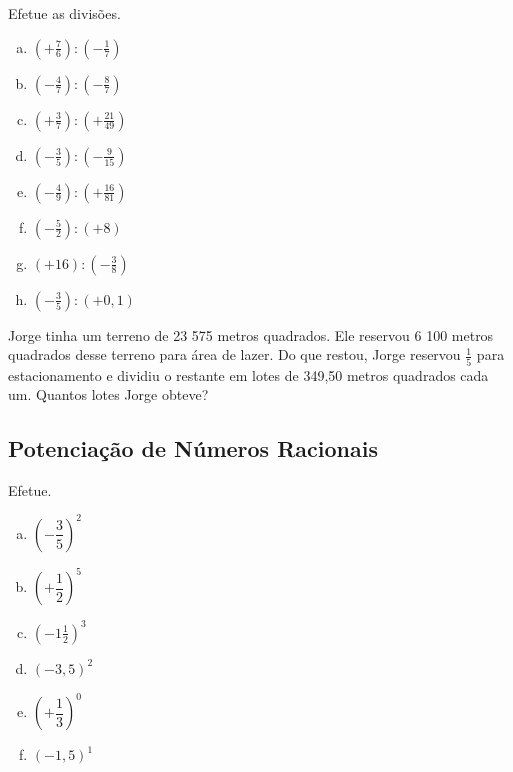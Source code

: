 \item Efetue as divisões.
\begin{multicols}{2}
\begin{enumerate}[a)]
	\item $\left(+\displaystyle\frac{7}{6}\right):\left(-\displaystyle\frac{1}{7}\right)$
	\item $\left(-\displaystyle\frac{4}{7}\right):\left(-\displaystyle\frac{8}{7}\right)$
	\item $\left(+\displaystyle\frac{3}{7}\right):\left(+\displaystyle\frac{21}{49}\right)$
	\item $\left(-\displaystyle\frac{3}{5}\right):\left(-\displaystyle\frac{9}{15}\right)$
	\item $\left(-\displaystyle\frac{4}{9}\right):\left(+\displaystyle\frac{16}{81}\right)$
	\item $\left(-\displaystyle\frac{5}{2}\right):(+8)$
	\item $(+16):\left(-\displaystyle\frac{3}{8}\right)$
	\item $\left(-\displaystyle\frac{3}{5}\right):(+0,1)$
\end{enumerate}
\end{multicols}

\item Jorge tinha um terreno de 23 575 metros quadrados. Ele reservou 6 100 metros quadrados desse terreno para área de lazer. Do que restou, Jorge reservou $\displaystyle\frac{1}{5}$ para estacionamento e dividiu o restante em lotes de 349,50 metros quadrados cada um. Quantos lotes Jorge obteve?


\subsection{Potenciação de Números Racionais}


\item Efetue.
\begin{multicols}{3}
\begin{enumerate}[a)]
	\item $\left(-\dfrac{3}{5}\right)^2$
	\item $\left(+\dfrac{1}{2}\right)^5$
	\item $\left(-1\frac{1}{2}\right)^3$
	\item $(-3,5)^2$
	\item $\left(+\dfrac{1}{3}\right)^0$
	\item $(-1,5)^1$
\end{enumerate}
\end{multicols}

